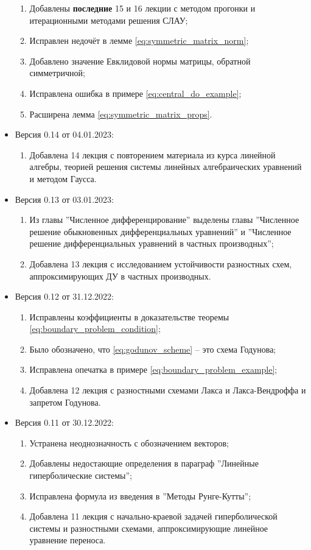 \documentclass{article}
\begin{document}
\begin{itemize}[nosep]
\begin{enumerate}[nosep]
		\item Добавлены \textbf{последние} 15 и 16 лекции с методом
			прогонки и итерационными методами решения СЛАУ;
		\item Исправлен недочёт в лемме
			\eqref{eq:symmetric_matrix_norm};
		\item Добавлено значение Евклидовой нормы матрицы, обратной
			симметричной;
		\item Исправлена ошибка в примере \eqref{eq:central_do_example};
		\item Расширена лемма \eqref{eq:symmetric_matrix_props}.
	\end{enumerate}
\item Версия 0.14 от 04.01.2023:
	\begin{enumerate}[nosep]
		\item Добавлена 14 лекция с повторением материала из курса
			линейной алгебры, теорией решения системы линейных
			алгебраических уравнений и методом Гаусса.
	\end{enumerate}
\item Версия 0.13 от 03.01.2023:
	\begin{enumerate}[nosep]
		\item Из главы ''Численное дифференцирование'' выделены главы
			''Численное решение обыкновенных дифференциальных
			уравнений'' и ''Численное решение дифференциальных
			уравнений в частных производных'';
		\item Добавлена 13 лекция с исследованием устойчивости
			разностных схем, аппроксимирующих ДУ в частных
			производных.
	\end{enumerate}
\item Версия 0.12 от 31.12.2022:
	\begin{enumerate}[nosep]
		\item Исправлены коэффициенты в доказательстве теоремы
			\eqref{eq:boundary_problem_condition};
		\item Было обозначено, что \eqref{eq:godunov_scheme} -- это
			схема Годунова;
		\item Исправлена опечатка в примере
			\eqref{eq:boundary_problem_example};
		\item Добавлена 12 лекция с разностными схемами Лакса и
			Лакса-Вендроффа и запретом Годунова.
	\end{enumerate}

\item Версия 0.11 от 30.12.2022:
	\begin{enumerate}[nosep]
		\item Устранена неоднозначность с обозначением векторов;
		\item Добавлены недостающие определения в параграф
			''Линейные гиперболические системы'';
		\item Исправлена формула из введения в ''Методы Рунге-Кутты'';
		\item Добавлена 11 лекция с начально-краевой задачей
			гиперболической системы и разностными схемами,
			аппроксимирующие линейное уравнение переноса.
	\end{enumerate}


\end{itemize}
\end{document}
